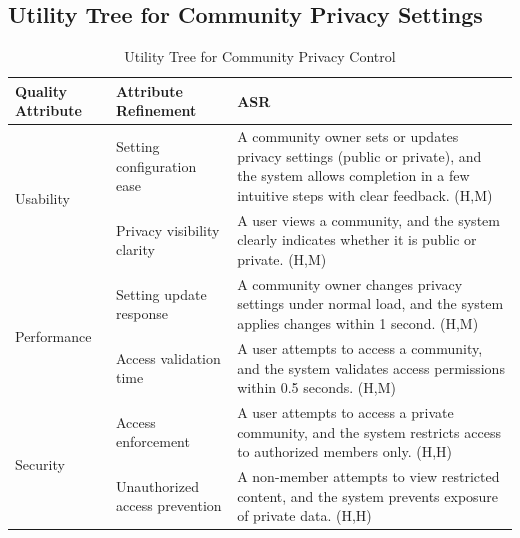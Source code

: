 \documentclass{article}
\begin{document}
\subsection{Utility Tree for Community Privacy Settings}

\begin{table}[H]
    \centering
    \caption{Utility Tree for Community Privacy Control}
    \begin{tabular}{|p{3cm}|p{4cm}|p{7cm}|}
        \hline
        \textbf{Quality Attribute} & \textbf{Attribute Refinement}                                                                                                                                & \textbf{ASR} \\
        \hline

        \multirow{2}{*}{Usability}
                                   & Setting configuration ease
                                   & A community owner sets or updates privacy settings (public or private), and the system allows completion in a few intuitive steps with clear feedback. (H,M)                \\
        \cline{2-3}
                                   & Privacy visibility clarity
                                   & A user views a community, and the system clearly indicates whether it is public or private. (H,M)                                                                           \\
        \hline

        \multirow{2}{*}{Performance}
                                   & Setting update response
                                   & A community owner changes privacy settings under normal load, and the system applies changes within 1 second. (H,M)                                                         \\
        \cline{2-3}
                                   & Access validation time
                                   & A user attempts to access a community, and the system validates access permissions within 0.5 seconds. (H,M)                                                                \\
        \hline

        \multirow{2}{*}{Security}
                                   & Access enforcement
                                   & A user attempts to access a private community, and the system restricts access to authorized members only. (H,H)                                                            \\
        \cline{2-3}
                                   & Unauthorized access prevention
                                   & A non-member attempts to view restricted content, and the system prevents exposure of private data. (H,H)                                                                   \\
        \hline


\end{tabular}
\end{table}
\end{document}
